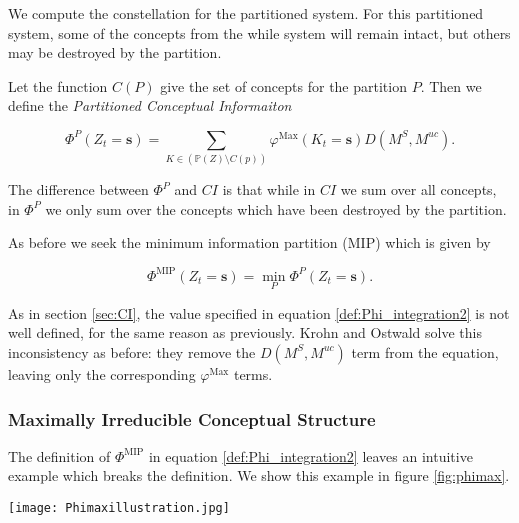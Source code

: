 We compute the constellation for the partitioned system. For this partitioned system, some of the concepts from the while system will remain intact, but others may be  destroyed by the partition.

Let the function $C(P)$ give the set of concepts for the partition $P$. Then we define the \textit{Partitioned Conceptual Informaiton}

\begin{equation}
\label{def:Phi_integration1}
\Phi^P(Z_t = \mathbf{s}) = \sum \limits_{K \in (\mathbb{P}(Z) \setminus C(p))} \varphi^{\text{Max}}(K_t = \mathbf{s})D(M^S, M^{uc}).
\end{equation}

The difference between $\Phi^P$ and $CI$ is that while in $CI$ we sum over all concepts, in $\Phi^P$ we only sum over the concepts which have been destroyed by the partition.

As before we seek the minimum information partition (MIP) which is given by

\begin{equation}
\label{def:Phi_integration2}
\Phi^{\text{MIP}} (Z_t = \mathbf{s}) = \min \limits_{P} \Phi^P(Z_t = \mathbf{s}).
\end{equation}

\begin{remark}
	As in section \ref{sec:CI}, the value specified in equation \ref{def:Phi_integration2} is not well defined, for the same reason as previously. Krohn and Ostwald solve this inconsistency  as before: they remove the $D(M^S, M^{uc})$ term from the equation, leaving only the corresponding $\varphi^{\text{Max}}$ terms.
\end{remark}

\subsubsection{Maximally Irreducible Conceptual Structure}

The definition of $\Phi^{\text{MIP}}$ in equation \ref{def:Phi_integration2} leaves an intuitive example which breaks the definition. We show this example in figure \ref{fig:phimax}. 

\begin{SCfigure}
	\centering
	\texttt{[image: Phimaxillustration.jpg]}
	\caption{We show a dense cluster of nodes which if taken to be the \textit{system} generates a large $\Phi^{\text{MIP}}$ in the shaded background. Now we add an extra node to this system. Given how this new node is sparsely linked to the original system, the MIP will simply be cutting off this node, resulting in a small change. The result of this is that $\Phi^{\text{MIP}}$ for the new system would be very small.}
	\label{fig:phimax}
\end{SCfigure}

